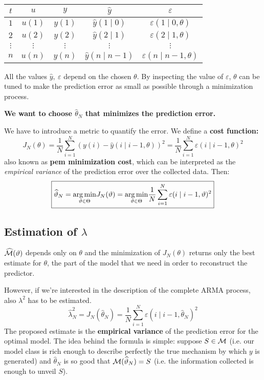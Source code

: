 \begin{center}

\begin{tabular}{ccccc}
\toprule 
 $t$ & $u$ & $y$ & $ \hat{y}$ & $ \varepsilon $ \\
\midrule 
 $1$ & $ u(1)$ & $ y(1)$ & $ \hat{y}(1\mid 0)$ & $ \varepsilon (1\mid 0,\theta)$ \\
$2$ & $ u(2)$ & $ y(2)$ & $ \hat{y}(2\mid 1)$ & $ \varepsilon (2\mid 1,\theta)$ \\
$ \vdots $ & $ \vdots $ & $ \vdots $ & $ \vdots $ & $ \vdots $ \\
$n$ & $ u(n)$ & $ y(n)$ & $ \hat{y}(n\mid n-1)$ & $ \varepsilon (n\mid n-1,\theta)$ \\
 \bottomrule
\end{tabular}
\end{center}

All the values $ \hat{y} ,\ \varepsilon $ depend on the chosen $ \theta $. By inspecting the value of $ \varepsilon $, $ \theta $ can be tuned to make the prediction error as small as possible through a minimization process.

\textbf{We want to choose $\hat{\theta}_{N}$ that minimizes the prediction error.}

We have to introduce a metric to quantify the error. We define a \textbf{cost function:} 
\begin{equation*}
	\boxed{J_{N}(\theta) =\frac{1}{N}\sum _{i=1}^{N}(y(i) -\hat{y}(i\mid i-1,\theta))^{2} =\frac{1}{N}\sum _{i=1}^{N} \varepsilon (i\mid i-1,\theta)^{2}}
\end{equation*}
also known as \textbf{\gls{pem} minimization cost}, which can be interpreted as the \emph{empirical variance} of the prediction error over the collected data. Then:
\[
	\boxed{\widehat{\vartheta }_{N} =\underset{\vartheta \in \Theta}{\operatorname*{arg\,min}} J_{N}(\vartheta) =\underset{\vartheta \in \Theta}{\operatorname*{arg\,min}}\frac{1}{N}\sum _{i=1}^{N} \varepsilon (i\mid i-1,\vartheta)^{2}}
\]

\subsection{Estimation of \texorpdfstring{$\lambda$}{lambda}}

$ \widehat{\mathcal{M}}(\vartheta)$ depends only on $ \theta $ and the minimization of $J_{N}(\theta)$ returns only the best estimate for $\theta$, the part of the model that we need in order to reconstruct the predictor.

However, if we're interested in the description of the complete ARMA process, also $\lambda^{2}$ has to be estimated. 
\begin{equation*}
	\boxed{\hat{\lambda }_{N}^{2} =J_{N}(\hat{\theta }_{N}) =\frac{1}{N}\sum _{i=1}^{N} \varepsilon (i\mid i-1,\hat{\theta }_{N})^{2}}
\end{equation*}
The proposed estimate is the \textbf{empirical variance} of the prediction error for the optimal model. The idea behind the formula is simple: suppose $ S\in \mathcal{M} $ (i.e. our model class is rich enough to describe perfectly the true mechanism by which $y$ is generated) and $\hat{\theta }_{N}$ is so good that $\mathcal{M}(\widehat{\vartheta }_{N}) =S$ (i.e. the information collected is enough to unveil $S$).

